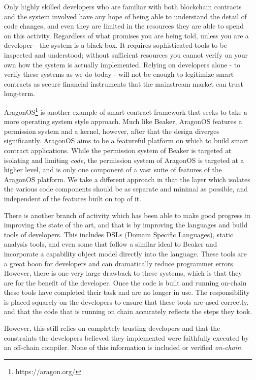 \documentclass[english,a4paper]{article}
\begin{document}
Only highly skilled developers who are familiar with both blockchain
contracts and the system involved have any hope of being able to
understand the detail of code changes, and even they are limited in the
resources they are able to spend on this activity. Regardless of what
promises you are being told, unless you are a developer - the system is
a black box. It requires sophisticated tools to be inspected and
understood; without sufficient resources you cannot verify on your own
how the system is actually implemented. Relying on developers alone - to
verify these systems as we do today - will not be enough to legitimize
smart contracts as secure financial instruments that the mainstream
market can trust long-term.

AragonOS\footnote{https://aragon.org/} is another example of smart contract
framework that seeks to take a more operating system style approach. Much like
Beaker, AragonOS features a permission system and a kernel, however, after that
the design diverges significantly. AragonOS aims to be a featureful platform on
which to build smart contract applications. While the permission system of
Beaker is targeted at isolating and limiting \emph{code}, the permission system
of AragonOS is targeted at a higher level, and is only one component of a vast
suite of features of the AragonOS platform. We take a different approach in that
the layer which isolates the various code components should be as separate and
minimal as possible, and independent of the features built on top of it.

There is another branch of activity which has been able to make good progress in
improving the state of the art, and that is by improving the languages and build
tools of developers. This includes DSLs (Domain Specific Languages), static
analysis tools, and even some that follow a similar ideal to Beaker and
incorporate a capability object model directly into the language. These tools
are a great boon for developers and can dramatically reduce programmer errors.
However, there is one very large drawback to these systems, which is that they
are for the benefit of the developer. Once the code is built and running
on-chain these tools have completed their task and are no longer in use. The
responsibility is placed squarely on the developers to ensure that these tools
are used correctly, and that the code that is running on chain accurately
reflects the steps they took.

However, this still relies on completely trusting developers and that the
constraints the developers believed they implemented were faithfully executed by
an off-chain compiler. None of this information is included or verified
\emph{on-chain}.
\end{document}
